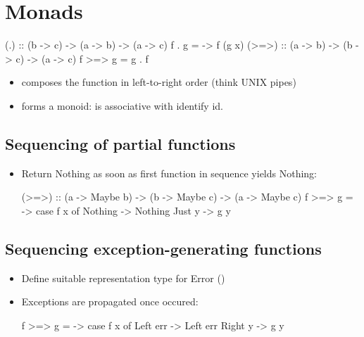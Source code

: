 

\chapter{Monads} %
\label{cha:monads}


\begin{codebox}[haskell]
(.) :: (b -> c) -> (a -> b) -> (a -> c)
f . g = \x -> f (g x)
(>=>) :: (a -> b) -> (b -> c) -> (a -> c)
f >=> g = g . f
\end{codebox}
\begin{itemize}
    \item {} composes the function in left-to-right order (think UNIX pipes)
    \item {} forms a monoid: \codeline{>=>} is associative with identify id.
\end{itemize}


\section{Sequencing of partial functions }

\begin{itemize}
    \item Return Nothing as soon as first function in sequence yields Nothing:\\
        \begin{codebox}[haskell]
(>=>) :: (a -> Maybe b) -> (b -> Maybe c) -> (a -> Maybe c)
f >=> g = \x -> case f x of
        Nothing -> Nothing
        Just y  -> g y
        \end{codebox}
\end{itemize}



\section*{Sequencing exception-generating functions }

 
\begin{itemize}
    \item Define suitable representation type for Error ()
    \item Exceptions are propagated once occured:
\begin{codebox}[haskell]
f >=> g = \x -> case f x of
    Left err -> Left err
    Right y  -> g y
\end{codebox}
\end{itemize}

